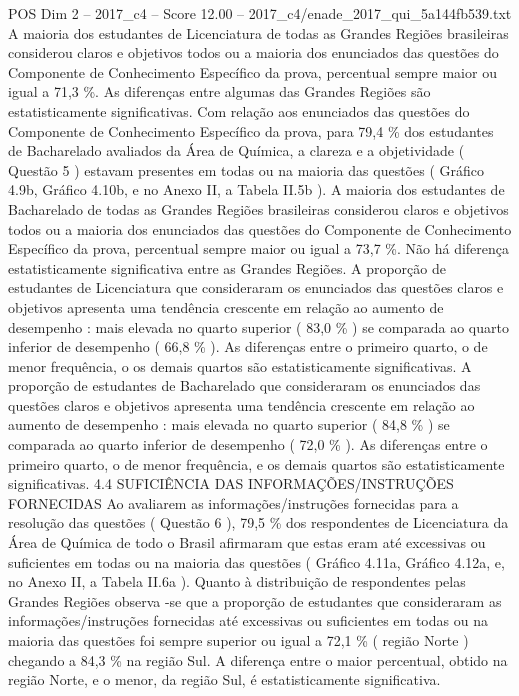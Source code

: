 \begin{textsample}{POS Dim 2 – 2017\_c4 – Score 12.00 – 2017\_c4/enade\_2017\_qui\_5a144fb539.txt}
A maioria dos estudantes de Licenciatura de todas as Grandes Regiões brasileiras considerou claros e objetivos todos ou a maioria dos enunciados das questões do Componente de Conhecimento Específico da prova, percentual sempre maior ou igual a 71,3 \%.
As diferenças entre algumas das Grandes Regiões são estatisticamente significativas.
Com relação aos enunciados das questões do Componente de Conhecimento Específico da prova, para 79,4 \% dos estudantes de Bacharelado avaliados da Área de Química, a clareza e a objetividade ( Questão 5 ) estavam presentes em todas ou na maioria das questões ( Gráfico 4.9b, Gráfico 4.10b, e no Anexo II, a Tabela II.5b ).
A maioria dos estudantes de Bacharelado de todas as Grandes Regiões brasileiras considerou claros e objetivos todos ou a maioria dos enunciados das questões do Componente de Conhecimento Específico da prova, percentual sempre maior ou igual a 73,7 \%.
Não há diferença estatisticamente significativa entre as Grandes Regiões.
A proporção de estudantes de Licenciatura que consideraram os enunciados das questões claros e objetivos apresenta uma tendência crescente em relação ao aumento de desempenho : mais elevada no quarto superior ( 83,0 \% ) se comparada ao quarto inferior de desempenho ( 66,8 \% ).
As diferenças entre o primeiro quarto, o de menor frequência, o os demais quartos são estatisticamente significativas.
A proporção de estudantes de Bacharelado que consideraram os enunciados das questões claros e objetivos apresenta uma tendência crescente em relação ao aumento de desempenho : mais elevada no quarto superior ( 84,8 \% ) se comparada ao quarto inferior de desempenho ( 72,0 \% ).
As diferenças entre o primeiro quarto, o de menor frequência, e os demais quartos são estatisticamente significativas. 4.4 SUFICIÊNCIA DAS INFORMAÇÕES/INSTRUÇÕES FORNECIDAS Ao avaliarem as informações/instruções fornecidas para a resolução das questões ( Questão 6 ), 79,5 \% dos respondentes de Licenciatura da Área de Química de todo o Brasil afirmaram que estas eram até excessivas ou suficientes em todas ou na maioria das questões ( Gráfico 4.11a, Gráfico 4.12a, e, no Anexo II, a Tabela II.6a ).
Quanto à distribuição de respondentes pelas Grandes Regiões observa -se que a proporção de estudantes que consideraram as informações/instruções fornecidas até excessivas ou suficientes em todas ou na maioria das questões foi sempre superior ou igual a 72,1 \% ( região Norte ) chegando a 84,3 \% na região Sul.
A diferença entre o maior percentual, obtido na região Norte, e o menor, da região Sul, é estatisticamente significativa.

\end{textsample}
